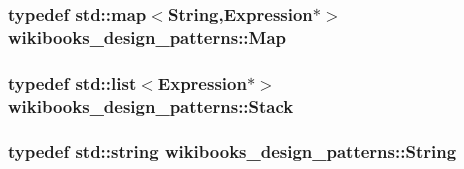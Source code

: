 \subsubsection[{\texorpdfstring{Map}{Map}}]{\setlength{\rightskip}{0pt plus 5cm}typedef std\+::map$<${\bf String},{\bf Expression}$\ast$$>$ {\bf wikibooks\+\_\+design\+\_\+patterns\+::\+Map}}\hypertarget{namespacewikibooks__design__patterns_adf1889a865861dea765d8a115cc66ae9}{}\label{namespacewikibooks__design__patterns_adf1889a865861dea765d8a115cc66ae9}
\subsubsection[{\texorpdfstring{Stack}{Stack}}]{\setlength{\rightskip}{0pt plus 5cm}typedef std\+::list$<${\bf Expression}$\ast$$>$ {\bf wikibooks\+\_\+design\+\_\+patterns\+::\+Stack}}\hypertarget{namespacewikibooks__design__patterns_a3247979de240b19de03793d4ec6ede0e}{}\label{namespacewikibooks__design__patterns_a3247979de240b19de03793d4ec6ede0e}
\subsubsection[{\texorpdfstring{String}{String}}]{\setlength{\rightskip}{0pt plus 5cm}typedef std\+::string {\bf wikibooks\+\_\+design\+\_\+patterns\+::\+String}}\hypertarget{namespacewikibooks__design__patterns_a603d2591ea56686888d0e4389481a453}{}\label{namespacewikibooks__design__patterns_a603d2591ea56686888d0e4389481a453}
